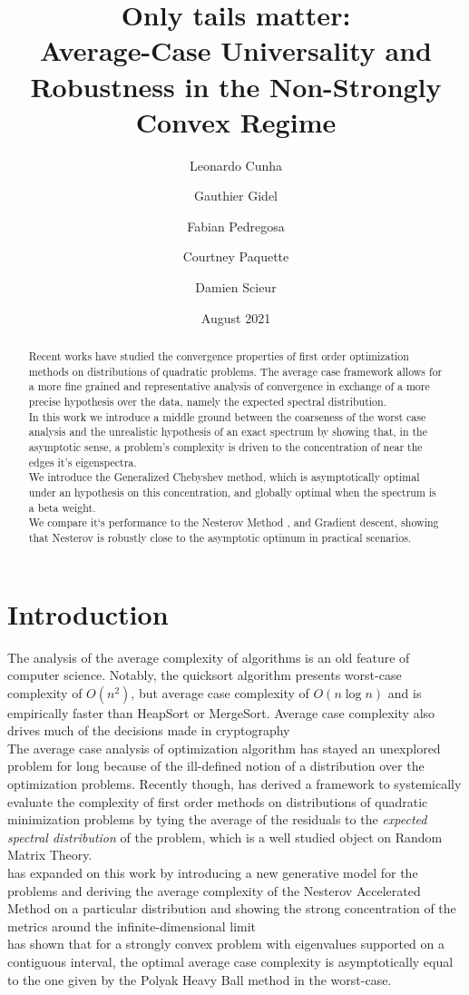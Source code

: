 \documentclass{article}
\title{Only tails matter: \\
Average-Case Universality and Robustness in the Non-Strongly Convex Regime}
\author{Leonardo Cunha
\and Gauthier Gidel \\
\and Fabian Pedregosa \\
\and Courtney Paquette \\
\and Damien Scieur}
\date{August 2021}
\begin{document}
\maketitle
\begin{abstract}
    Recent works \cite{pedregosa2020acceleration,paquette2020halting,scieur2020universal} have studied the convergence properties of first order optimization methods on distributions of quadratic problems. 
    The average case framework allows for a more fine grained and representative analysis of convergence in exchange of a more precise hypothesis over the data, namely the expected spectral distribution. \\
    In this work we introduce a middle ground between the coarseness of the  worst case analysis and the unrealistic hypothesis of an exact spectrum by showing that, in the asymptotic sense, a problem's complexity is driven to the concentration of near the edges it's eigenspectra. \\
    We introduce the Generalized Chebyshev method, which is   asymptotically optimal under an hypothesis on this concentration, and globally optimal when the spectrum is a beta weight.\\
    We compare it`s performance to the Nesterov Method \cite{nesterov2003introductory}, and Gradient descent, showing that Nesterov is robustly close to the asymptotic optimum in practical scenarios.
\end{abstract}
\section{Introduction}
The analysis of the average complexity of algorithms is an old feature of computer science. Notably, the quicksort algorithm presents worst-case complexity of $O(n^2)$, but average case complexity of $O(n\log n)$ and is  empirically faster than HeapSort or MergeSort. Average case complexity also drives much of the decisions made in cryptography \cite{bogdanov2006average}\\
The average case analysis of optimization algorithm has stayed an unexplored problem for long because of the ill-defined notion of a distribution over the optimization problems. Recently though, \cite{pedregosa2020acceleration} has derived a framework to systemically evaluate the complexity of first order methods on distributions of quadratic minimization problems by tying the average of the residuals to the \textit{expected spectral distribution} of the problem, which is a well studied object on Random Matrix Theory. \\
\cite{paquette2020halting} has expanded on this work by introducing a new generative model for the problems and deriving the average complexity of the Nesterov Accelerated Method on a particular distribution and showing the strong concentration of the metrics around the infinite-dimensional limit \\
\cite{scieur2020universal} has shown that for a strongly convex problem with eigenvalues supported on a contiguous interval, the optimal average case complexity is asymptotically equal to the one given by the Polyak Heavy Ball method in the worst-case.  
\end{document}
